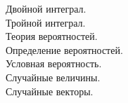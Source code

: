 \documentclass[a4paper]{article}
\begin{document}
Двойной интеграл. \\


Тройной интеграл. \\


Теория вероятностей. \\
Определение вероятностей. \\


Условная вероятность. \\


Случайные величины. \\


\newpage
Случайные векторы. \\

\end{document}
